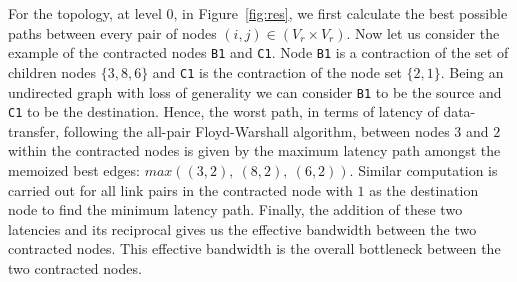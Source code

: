 \begin{itemize}
  For the topology, at level 0, in Figure~\ref{fig:res}, we first
  calculate the best possible paths between every pair of nodes
  \mbox{$(i,j) \in (V_r \times V_r)$}. Now let us consider the example
  of the contracted nodes \texttt{B1} and \texttt{C1}. Node \texttt{B1}
  is a contraction of the set of children nodes $\{3, 8, 6\}$ and
  \texttt{C1} is the contraction of the node set $\{2, 1\}$. Being an
  undirected graph with loss of generality we can consider \texttt{B1}
  to be the source and \texttt{C1} to be the destination. Hence, the
  worst path, in terms of latency of data-transfer, following the
  all-pair Floyd-Warshall algorithm, between nodes $3$ and $2$ within
  the contracted nodes is given by the maximum latency path amongst the
  memoized best edges: $max((3,2),\ (8,2),\ (6,2))$. Similar computation
  is carried out for all link pairs in the contracted node with $1$ as
  the destination node to find the minimum latency path. Finally, the
  addition of these two latencies and its reciprocal gives us the
  effective bandwidth between the two contracted nodes. This effective
  bandwidth is the overall bottleneck between the two contracted nodes.




\end{itemize}

